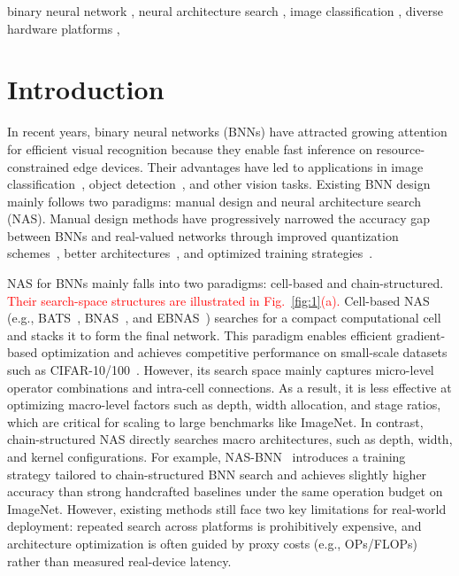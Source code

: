 \documentclass[a4paper,fleqn]{cas-sc}
\begin{document}
\begin{keywords}
binary neural network \sep 
neural architecture search \sep 
image classification \sep 
diverse hardware platforms \sep 
\end{keywords}

\maketitle

\section{Introduction}
In recent years, binary neural networks (BNNs) have attracted growing attention for efficient visual recognition because they enable fast inference on resource-constrained edge devices. Their advantages have led to applications in image classification~\cite{LIN2025105646, VORABBI2025105524}, object detection~\cite{Lin2025}, and other vision tasks. Existing BNN design mainly follows two paradigms: manual design and neural architecture search (NAS). Manual design methods have progressively narrowed the accuracy gap between BNNs and real-valued networks through improved quantization schemes~\cite{Rastegari2016, Adrian2019,qin2020forward,lin2020rotated,xu2021recu,Tu2022}, better architectures~\cite{Liu2018, Liu2020,Joseph2020,Tu2022,Zhang2022, Guo2022,lee2023insta,Zhang2025}, and optimized training strategies~\cite{Liu2018,martinez2020training,Liu2020,shang2022lipschitz,livochka2021initialization,liu2021adam}.

NAS for BNNs mainly falls into two paradigms: cell-based and chain-structured. \textcolor{red}{Their search-space structures are illustrated in Fig.~\ref{fig:1}(a).} Cell-based NAS (e.g., BATS~\cite{Bulat2020}, BNAS~\cite{Kim2020}, and EBNAS~\cite{Shi2023}) searches for a compact computational cell and stacks it to form the final network. This paradigm enables efficient gradient-based optimization and achieves competitive performance on small-scale datasets such as CIFAR-10/100~\cite{Krizhevsky2009}. However, its search space mainly captures micro-level operator combinations and intra-cell connections. As a result, it is less effective at optimizing macro-level factors such as depth, width allocation, and stage ratios, which are critical for scaling to large benchmarks like ImageNet. In contrast, chain-structured NAS directly searches macro architectures, such as depth, width, and kernel configurations. For example, NAS-BNN~\cite{Lin2025} introduces a training strategy tailored to chain-structured BNN search and achieves slightly higher accuracy than strong handcrafted baselines under the same operation budget on ImageNet. However, existing methods still face two key limitations for real-world deployment: repeated search across platforms is prohibitively expensive, and architecture optimization is often guided by proxy costs (e.g., OPs/FLOPs) rather than measured real-device latency.
\end{document}
